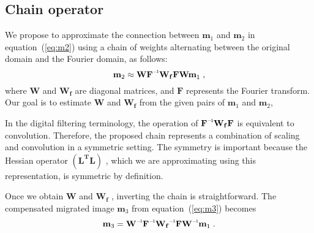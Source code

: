 \subsection*{Chain operator}

We propose to approximate the connection between $\mathbf{m}_1$ and $\mathbf{m}_2$ in equation~(\ref{eq:m2}) using a chain of weights alternating between the original domain and the Fourier domain, as follows:
\begin{equation}
    \label{eq:wfw}
    \mathbf{m}_2 \approx \mathbf{W\inv{F}W_{f}FW m}_1\;,
\end{equation}
where $\mathbf{W}$ and $\mathbf{W_f}$ are diagonal matrices, and $\mathbf{F}$ represents the Fourier transform. Our goal is to estimate $\mathbf{W}$ and $\mathbf{W_f}$ from the given pairs of $\mathbf{m}_1$ and $\mathbf{m}_2$,

 In the digital filtering terminology, the operation of $\mathbf{\inv{F}W_{f}F}$ is equivalent to convolution. Therefore, the proposed chain represents a combination of scaling and convolution in a symmetric setting. The symmetry is important because the Hessian operator $\mathbf{(L^T L)}$ , which we are approximating using this representation, is symmetric by definition. 
 
 Once we obtain $\mathbf{W} $ and $ \mathbf{W_f }$ , inverting the chain is straightforward. The compensated migrated image $\mathbf{m}_3$ from equation~(\ref{eq:m3}) becomes
\begin{equation}
 \mathbf{
m}_{3} = 
\mathbf{\inv{W}\inv{F}\inv{W_f}F\inv{W} m}_1\;.
\label{lsmig}
\end{equation}
 



